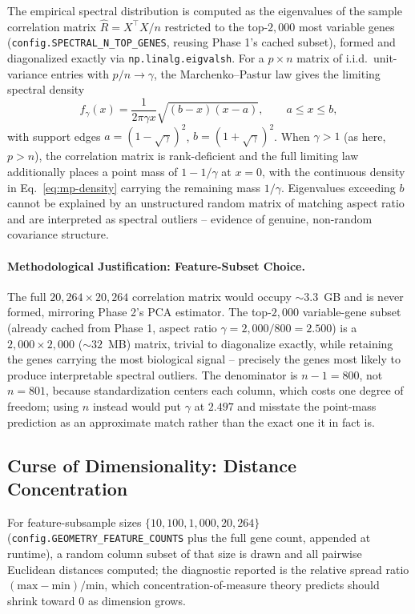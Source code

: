 \documentclass[11pt]{article}
\begin{document}
The empirical spectral distribution is computed as the eigenvalues of the
sample correlation matrix $\hat{R} = X^\top X / n$ restricted to the
top-$2{,}000$ most variable genes
(\texttt{config.SPECTRAL\_N\_TOP\_GENES}, reusing Phase 1's cached subset),
formed and diagonalized exactly via \texttt{np.linalg.eigvalsh}. For a
$p \times n$ matrix of i.i.d.\ unit-variance entries with $p/n \to \gamma$,
the Marchenko--Pastur law gives the limiting spectral density
\begin{equation}
f_\gamma(x) = \frac{1}{2 \pi \gamma x} \sqrt{(b-x)(x-a)}, \qquad a \leq x \leq b,
\label{eq:mp-density}
\end{equation}
with support edges $a = (1-\sqrt{\gamma})^2$, $b = (1+\sqrt{\gamma})^2$.
When $\gamma > 1$ (as here, $p > n$), the correlation matrix is
rank-deficient and the full limiting law additionally places a point mass
of $1 - 1/\gamma$ at $x=0$, with the continuous density in
Eq.~\ref{eq:mp-density} carrying the remaining mass $1/\gamma$. Eigenvalues
exceeding $b$ cannot be explained by an unstructured random matrix of
matching aspect ratio and are interpreted as spectral outliers -- evidence
of genuine, non-random covariance structure.

\paragraph{Methodological Justification: Feature-Subset Choice.} The full
$20{,}264 \times 20{,}264$ correlation matrix would occupy $\sim 3.3$~GB and
is never formed, mirroring Phase 2's PCA estimator. The top-$2{,}000$
variable-gene subset (already cached from Phase 1, aspect ratio
$\gamma = 2{,}000/800 = 2.500$) is a $2{,}000 \times 2{,}000$
($\sim 32$~MB) matrix, trivial to diagonalize exactly, while retaining the
genes carrying the most biological signal -- precisely the genes most
likely to produce interpretable spectral outliers. The denominator is
$n-1=800$, not $n=801$, because standardization centers each column,
which costs one degree of freedom; using $n$ instead would put $\gamma$
at $2.497$ and misstate the point-mass prediction as an approximate match
rather than the exact one it in fact is.

\subsection{Curse of Dimensionality: Distance Concentration}

For feature-subsample sizes $\{10, 100, 1{,}000, 20{,}264\}$
(\texttt{config.GEOMETRY\_FEATURE\_COUNTS} plus the full gene count,
appended at runtime), a random column subset of that size is drawn and all
pairwise Euclidean distances computed; the diagnostic reported is the
relative spread ratio $(\text{max} - \text{min})/\text{min}$, which
concentration-of-measure theory predicts should shrink toward $0$ as
dimension grows.
\end{document}
